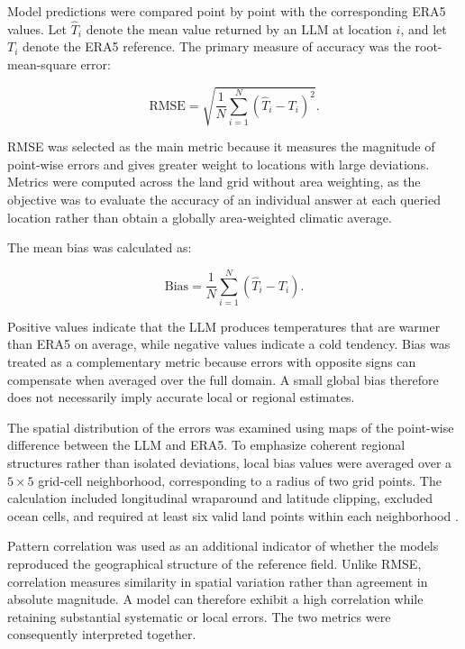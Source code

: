 Model predictions were compared point by point with the corresponding ERA5 values. Let \(\hat{T}_i\) denote the mean value returned by an LLM at location \(i\), and let \(T_i\) denote the ERA5 reference. The primary measure of accuracy was the root-mean-square error:

\begin{equation}
    \mathrm{RMSE} =
    \sqrt{
        \frac{1}{N}
        \sum_{i=1}^{N}
        \left(\hat{T}_i-T_i\right)^2
    }.
\end{equation}

RMSE was selected as the main metric because it measures the magnitude of point-wise errors and gives greater weight to locations with large deviations. Metrics were computed across the land grid without area weighting, as the objective was to evaluate the accuracy of an individual answer at each queried location rather than obtain a globally area-weighted climatic average.

The mean bias was calculated as:

\begin{equation}
    \mathrm{Bias} =
    \frac{1}{N}
    \sum_{i=1}^{N}
    \left(\hat{T}_i-T_i\right).
\end{equation}

Positive values indicate that the LLM produces temperatures that are warmer than ERA5 on average, while negative values indicate a cold tendency. Bias was treated as a complementary metric because errors with opposite signs can compensate when averaged over the full domain. A small global bias therefore does not necessarily imply accurate local or regional estimates.

The spatial distribution of the errors was examined using maps of the point-wise difference between the LLM and ERA5. To emphasize coherent regional structures rather than isolated deviations, local bias values were averaged over a \(5\times5\) grid-cell neighborhood, corresponding to a radius of two grid points. The calculation included longitudinal wraparound and latitude clipping, excluded ocean cells, and required at least six valid land points within each neighborhood \citep{gilleland_intercomparison_2009}.

Pattern correlation was used as an additional indicator of whether the models reproduced the geographical structure of the reference field. Unlike RMSE, correlation measures similarity in spatial variation rather than agreement in absolute magnitude. A model can therefore exhibit a high correlation while retaining substantial systematic or local errors. The two metrics were consequently interpreted together.

